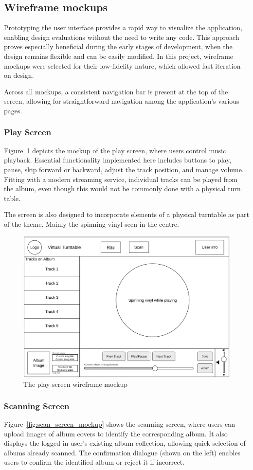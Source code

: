 \subsection{Wireframe mockups}
Prototyping the user interface provides a rapid way to visualize the application, enabling design evaluations without the need to write any code. This approach proves especially beneficial during the early stages of development, when the design remains flexible and can be easily modified. In this project, wireframe mockups were selected for their low-fidelity nature, which allowed fast iteration on design.

Across all mockups, a consistent navigation bar is present at the top of the screen, allowing for straightforward navigation among the application's various pages.

\subsubsection{Play Screen}
Figure~\ref{fig:play_screen_mockup} depicts the mockup of the play screen, where users control music playback. Essential functionality implemented here includes buttons to play, pause, skip forward or backward, adjust the track position, and manage volume. Fitting with a modern streaming service, individual tracks can be played from the album, even though this would not be commonly done with a physical turn table.

The screen is also designed to incorporate elements of a physical turntable as part of the theme. Mainly the spinning vinyl seen in the centre.
\begin{figure} [H]
    \centering
    \includegraphics[width=0.6\linewidth]{figures/play_screen_mockup.png}
    \caption{The play screen wireframe mockup}
    \label{fig:play_screen_mockup}
\end{figure}

\subsubsection{Scanning Screen}
Figure~\ref{fig:scan_screen_mockup} shows the scanning screen, where users can upload images of album covers to identify the corresponding album. It also displays the logged-in user’s existing album collection, allowing quick selection of albums already scanned. The confirmation dialogue (shown on the left) enables users to confirm the identified album or reject it if incorrect.

